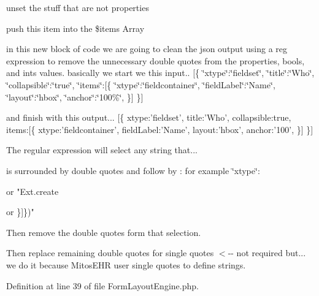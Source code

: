 unset the stuff that are not properties

push this item into the \$items \-Array

in this new block of code we are going to clean the json output using a reg expression to remove the unnecessary double quotes from the properties, bools, and ints values. basically we start we this input.. \mbox{[}\{ \char`\"{}xtype\char`\"{}\-:\char`\"{}fieldset\char`\"{}, \char`\"{}title\char`\"{}\-:\char`\"{}\-Who\char`\"{}, \char`\"{}collapsible\char`\"{}\-:\char`\"{}true\char`\"{}, \char`\"{}items\char`\"{}\-:\mbox{[}\{ \char`\"{}xtype\char`\"{}\-:\char`\"{}fieldcontainer\char`\"{}, \char`\"{}field\-Label\char`\"{}\-:\char`\"{}\-Name\char`\"{}, \char`\"{}layout\char`\"{}\-:\char`\"{}hbox\char`\"{}, \char`\"{}anchor\char`\"{}\-:\char`\"{}100\%\char`\"{}, \}\mbox{]} \}\mbox{]}

and finish with this output... \mbox{[}\{ xtype\-:'fieldset', title\-:'\-Who', collapsible\-:true, items\-:\mbox{[}\{ xtype\-:'fieldcontainer', field\-Label\-:'\-Name', layout\-:'hbox', anchor\-:'100', \}\mbox{]} \}\mbox{]}

\-The regular expression will select any string that...

is surrounded by double quotes and follow by \-: for example \char`\"{}xtype\char`\"{}\-:

or "\-Ext.\-create

or \}\mbox{]}\})"

\-Then remove the double quotes form that selection.

\-Then replace remaining double quotes for single quotes $<$-\/-\/ not required but... we do it because \-Mitos\-E\-H\-R user single quotes to define strings.

\-Definition at line 39 of file \-Form\-Layout\-Engine.\-php.


